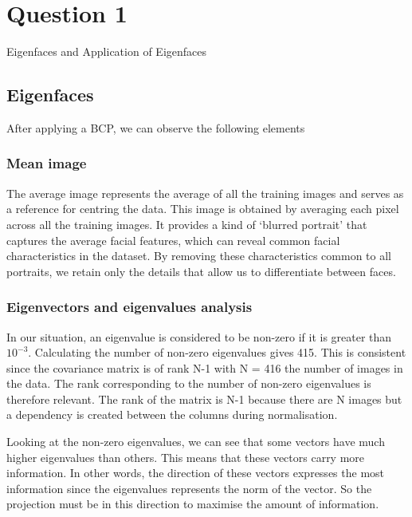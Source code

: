 
\vspace{-2em}
\section{Question 1} Eigenfaces and Application of Eigenfaces
\newline

\subsection{Eigenfaces}
After applying a BCP, we can observe the following elements
\subsubsection{Mean image}

The average image represents the average of all the training images and serves as a reference for centring the data. This image is obtained by averaging each pixel across all the training images. It provides a kind of ‘blurred portrait’ that captures the average facial features, which can reveal common facial characteristics in the dataset. By removing these characteristics common to all portraits, we retain only the details that allow us to differentiate between faces.

\subsubsection{Eigenvectors and eigenvalues analysis}

In our situation, an eigenvalue is considered to be non-zero if it is greater than $10^{-3}$. Calculating the number of non-zero eigenvalues gives 415. This is consistent since the covariance matrix is of rank N-1 with N = 416 the number of images in the data. The rank corresponding to the number of non-zero eigenvalues is therefore relevant. The rank of the matrix is N-1 because there are N images but a dependency is created between the columns during normalisation.
\newline

Looking at the non-zero eigenvalues, we can see that some vectors have much higher eigenvalues than others. This means that these vectors carry more information. In other words, the direction of these vectors expresses the most information since the eigenvalues represents the norm of the vector. So the projection must be in this direction to maximise the amount of information.
\newline

